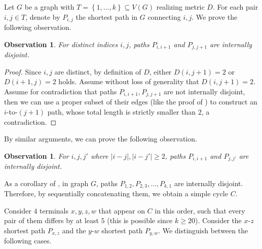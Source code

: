 \documentclass[11pt]{article}
\newtheorem{observation}[theorem]{Observation}
\newcommand{\set}[1]{\left\{ #1 \right\}}
\begin{document}
Let $G$ be a graph with $T=\set{1,\ldots, k}\subseteq V(G)$ realizing metric $D$. For each pair $i,j\in T$, denote by $P_{i,j}$ the shortest path in $G$ connecting $i,j$. We prove the following observation.

\begin{observation}
\label{obs: disjoint}
For distinct indices $i,j$, paths $P_{i,i+1}$ and $P_{j,j+1}$ are internally disjoint.
\end{observation}
\begin{proof}
Since $i,j$ are distinct, by definition of $D$, either $D(i,j+1)=2$ or $D(i+1,j)=2$ holds. Assume without loss of generality that $D(i,j+1)=2$. Assume for contradiction that paths $P_{i,i+1}, P_{j,j+1}$ are not internally disjoint, then we can use a proper subset of their edges (like the proof of ) to construct an $i$-to-$(j+1)$ path, whose total length is strictly smaller than $2$, a contradiction.
\end{proof}

By similar arguments, we can prove the following observation.

\begin{observation}
\label{obs: disjoint2}
For $i,j,j'$ where $|i-j|,|i-j'|\ge 2$, paths $P_{i,i+1}$ and $P_{j,j'}$ are internally disjoint.
\end{observation}

As a corollary of , in graph $G$, paths $P_{1,2},P_{2,3},\ldots,P_{k,1}$ are internally disjoint.
Therefore, by sequentially concatenating them, we obtain a simple cycle $C$.

Consider $4$ terminals $x,y,z,w$ that appear on $C$ in this order, such that every pair of them differs by at least $5$ (this is possible since $k\ge 20$). Consider the $x$-$z$ shortest path $P_{x,z}$ and the $y$-$w$ shortest path $P_{y,w}$. We distinguish between the following cases.
\end{document}
